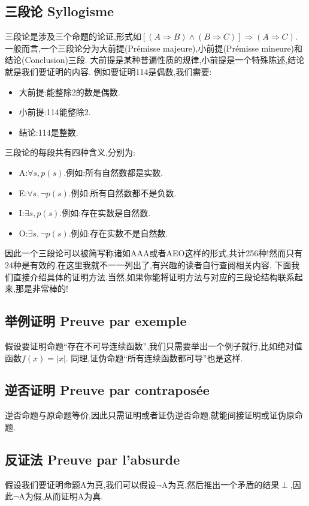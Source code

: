 \documentclass[12pt, a4paper, oneside]{ctexbook}
\begin{document}
  \subsection{三段论 Syllogisme}
  三段论是涉及三个命题的论证,形式如$[(A\Rightarrow B)\land (B\Rightarrow C)]\Rightarrow (A\Rightarrow C)$.
  一般而言,一个三段论分为大前提(Prémisse majeure),小前提(Prémisse mineure)和结论(Conclusion)三段.
  大前提是某种普遍性质的规律,小前提是一个特殊陈述,结论就是我们要证明的内容.
  例如要证明114是偶数,我们需要:\begin{itemize}
    \item 大前提:能整除2的数是偶数.
    \item 小前提:114能整除2.
    \item 结论:114是整数.
  \end{itemize}
  三段论的每段共有四种含义,分别为:
  \begin{itemize}
    \item A:$\forall s,p(s)$.例如:所有自然数都是实数.
    \item E:$\forall s,\lnot p(s)$.例如:所有自然数都不是负数.
    \item I:$\exists s,p(s)$.例如:存在实数是自然数.
    \item O:$\exists s,\lnot p(s)$.例如:存在实数不是自然数.
  \end{itemize}
  因此一个三段论可以被简写称诸如AAA或者AEO这样的形式,共计256种!然而只有24种是有效的.在这里我就不一一列出了,有兴趣的读者自行查阅相关内容.
  下面我们直接介绍具体的证明方法.当然,如果你能将证明方法与对应的三段论结构联系起来,那是非常棒的!

  \subsection{举例证明 Preuve par exemple}
  假设要证明命题“存在不可导连续函数”,我们只需要举出一个例子就行,比如绝对值函数$f(x)=|x|$.
  同理,证伪命题“所有连续函数都可导”也是这样.
  \subsection{逆否证明 Preuve par contraposée}
  逆否命题与原命题等价,因此只需证明或者证伪逆否命题,就能间接证明或证伪原命题.
  \subsection{反证法 Preuve par l'absurde}
  假设我们要证明命题A为真,我们可以假设$\lnot $A为真,然后推出一个矛盾的结果$\perp $,因此$\lnot $A为假,从而证明A为真.\\
  
\end{document}
